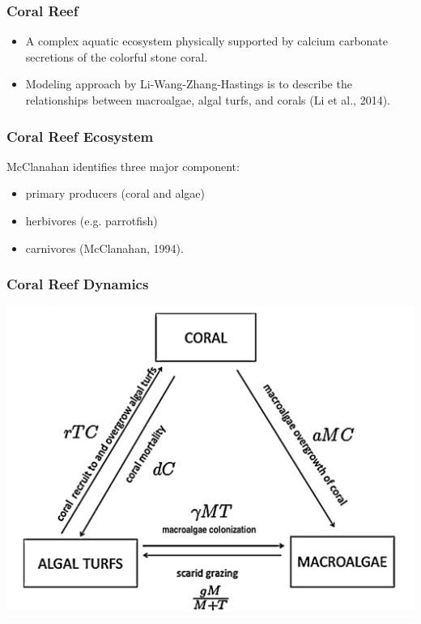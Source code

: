 
\begin{frame}
\frametitle{Coral Reef}
\begin{itemize}
\item A complex aquatic ecosystem physically supported by calcium carbonate secretions of the colorful stone coral. \\
\item Modeling approach by Li-Wang-Zhang-Hastings is to describe the relationships between macroalgae, algal turfs, and corals (Li et al., 2014).
\end{itemize}
\end{frame}

\begin{frame}
\frametitle{Coral Reef Ecosystem} McClanahan identifies three major component:
\begin{itemize}
\item primary producers (coral and algae)\\
\item herbivores (e.g. parrotfish)\\
\item carnivores (McClanahan, 1994).
\end{itemize}
\end{frame}

\begin{frame}
\frametitle{Coral Reef Dynamics}
\includegraphics[scale=.175]{./coral-reef-triangle.png}
\end{frame}

